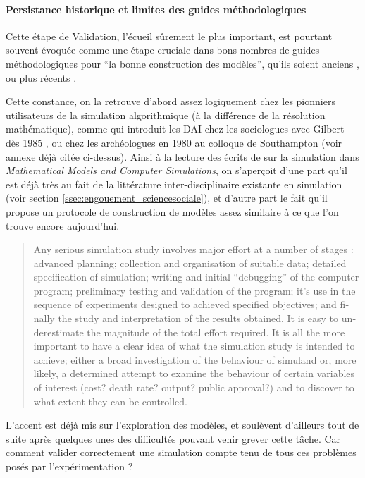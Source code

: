 \paragraph{Persistance historique et limites des guides méthodologiques}

Cette étape de Validation, l'écueil sûrement le plus important, est pourtant souvent évoquée comme une étape cruciale dans bons nombres de guides méthodologiques pour \enquote{la bonne construction des modèles}, qu'ils soient anciens \autocites[195]{Beshers1965}{Guetzkow1972, Dutton1971,Naylor1966, Naylor1967}, ou plus récents \autocite{Amblard2006, Gilbert2008}.

Cette constance, on la retrouve d'abord assez logiquement chez les pionniers utilisateurs de la simulation algorithmique (à la différence de la résolution mathématique), comme \textcite{Doran1975, Doran1986} qui introduit les DAI chez les sociologues avec Gilbert dès 1985 \autocite{Gilbert1985}, ou chez les archéologues en 1980 au colloque de Southampton \autocites{Doran1982, Renfrew1982} (voir annexe déjà citée ci-dessus). Ainsi à la lecture des écrits de \textcite[300-301]{Doran1975} sur la simulation dans \textit{Mathematical Models and Computer Simulations}, on s'aperçoit d'une part qu'il est déjà très au fait de la littérature inter-disciplinaire existante en simulation \autocite{Guetzkow1972} (voir section \ref{ssec:engouement_sciencesociale}), et d'autre part le fait qu'il propose un protocole de construction de modèles assez similaire à ce que l'on trouve encore aujourd'hui.

\foreignblockquote{english}[\cite{Guetzkow1972}]{Any serious simulation study involves major effort at a number of stages : advanced planning; collection and organisation of suitable data; detailed specification of simulation; writing and initial \enquote{debugging} of the computer program; preliminary testing and validation of the program; it's use in the sequence of experiments designed to achieved specified objectives; and finally the study and interpretation of the results obtained. It is easy to underestimate the magnitude of the total effort required. It is all the more important to have a clear idea of what the simulation study is intended to achieve; either a broad investigation of the behaviour of simuland  or, more likely, a determined attempt to examine the behaviour of certain variables of interest (cost? death rate? output? public approval?) and to discover to what extent they can be controlled.}

L'accent est déjà mis sur l'exploration des modèles, et \textcite[301]{Doran1975} soulèvent d'ailleurs tout de suite après quelques unes des difficultés pouvant venir grever cette tâche. Car comment valider correctement une simulation compte tenu de tous ces problèmes posés par l'expérimentation ?

